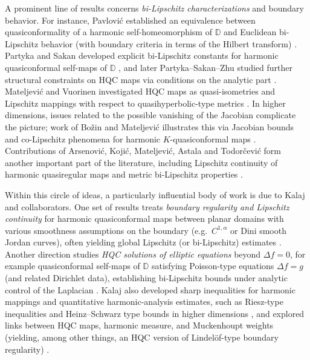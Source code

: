 \documentclass{amsart}
\newcommand{\D}{\mathbb{D}}
\begin{document}
A prominent line of results concerns \emph{bi-Lipschitz characterizations} and boundary behavior.
For instance, Pavlovi\'{c} established an equivalence between quasiconformality of a harmonic
self-homeomorphism of $\D$ and Euclidean bi-Lipschitz behavior (with boundary criteria in terms
of the Hilbert transform) \cite{Pavlovic2002}. Partyka and Sakan developed explicit
bi-Lipschitz constants for harmonic quasiconformal self-maps of $\D$ \cite{PartykaSakan2007},
and later Partyka--Sakan--Zhu studied further structural constraints on HQC maps via conditions
on the analytic part \cite{PartykaSakanZhu2018}. Mateljevi\'{c} and Vuorinen investigated HQC
maps as quasi-isometries and Lipschitz mappings with respect to quasihyperbolic-type metrics
\cite{MateljevicVuorinen2010}. In higher dimensions, issues related to the possible vanishing
of the Jacobian complicate the picture; work of Bo\v{z}in and Mateljevi\'{c} illustrates this
via Jacobian bounds and co-Lipschitz phenomena for harmonic $K$-quasiconformal maps
\cite{BozinMateljevic2015}. Contributions of Arsenovi\'{c}, Koji\'{c}, Mateljevi\'{c}, Astala and
Todor\v{c}evi\'{c} form another important part of the literature, including
Lipschitz continuity of harmonic quasiregular maps and metric bi-Lipschitz properties
\cite{ArsenovicKojicMateljevic2008,Manojlovic2009,Todorcevic2019,AstalaManojlovic2015}.

Within this circle of ideas, a particularly influential body of work is due to
Kalaj and collaborators. One set of results treats \emph{boundary regularity and Lipschitz
continuity} for harmonic quasiconformal maps between planar domains with various smoothness
assumptions on the boundary (e.g.\ $C^{1,\alpha}$ or Dini smooth Jordan curves),
often yielding global Lipschitz (or bi-Lipschitz) estimates
\cite{Kalaj2008MZ,Kalaj2017Dini,Kalaj2022RMI}.
Another direction studies \emph{HQC solutions of elliptic equations} beyond $\Delta f=0$,
for example quasiconformal self-maps of $\D$ satisfying Poisson-type equations $\Delta f=g$
(and related Dirichlet data), establishing bi-Lipschitz bounds under analytic control of the
Laplacian \cite{KalajPavlovic2011,KalajSaksman2019,KalajZlaticanin2019}.
Kalaj also developed sharp inequalities for harmonic mappings and quantitative harmonic-analysis
estimates, such as Riesz-type inequalities \cite{Kalaj2019Riesz} and Heinz--Schwarz type bounds
in higher dimensions \cite{Kalaj2016HeinzSchwarz}, and explored links between HQC maps,
harmonic measure, and Muckenhoupt weights (yielding, among other things, an HQC version of
Lindel\"of-type boundary regularity) \cite{Kalaj2015Muckenhoupt}.
\end{document}
